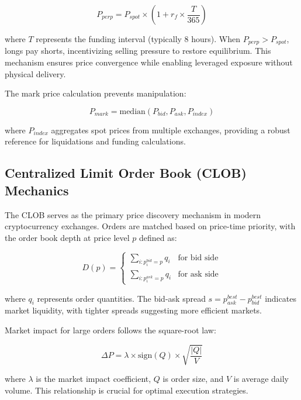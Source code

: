 \documentclass{report}
\begin{document}
\begin{equation}
P_{perp} = P_{spot} \times (1 + r_f \times \frac{T}{365})
\end{equation}

where $T$ represents the funding interval (typically 8 hours). When $P_{perp} > P_{spot}$, longs pay shorts, incentivizing selling pressure to restore equilibrium. This mechanism ensures price convergence while enabling leveraged exposure without physical delivery.

The mark price calculation prevents manipulation:

\begin{equation}
P_{mark} = \text{median}(P_{bid}, P_{ask}, P_{index})
\end{equation}

where $P_{index}$ aggregates spot prices from multiple exchanges, providing a robust reference for liquidations and funding calculations.

\subsection{Centralized Limit Order Book (CLOB) Mechanics}

The CLOB serves as the primary price discovery mechanism in modern cryptocurrency exchanges. Orders are matched based on price-time priority, with the order book depth at price level $p$ defined as:

\begin{equation}
D(p) = \begin{cases}
\sum_{i: p_i^{bid} = p} q_i & \text{for bid side} \\
\sum_{i: p_i^{ask} = p} q_i & \text{for ask side}
\end{cases}
\end{equation}

where $q_i$ represents order quantities. The bid-ask spread $s = p_{ask}^{best} - p_{bid}^{best}$ indicates market liquidity, with tighter spreads suggesting more efficient markets.

Market impact for large orders follows the square-root law:

\begin{equation}
\Delta P = \lambda \times \text{sign}(Q) \times \sqrt{\frac{|Q|}{V}}
\end{equation}

where $\lambda$ is the market impact coefficient, $Q$ is order size, and $V$ is average daily volume. This relationship is crucial for optimal execution strategies.
\end{document}
